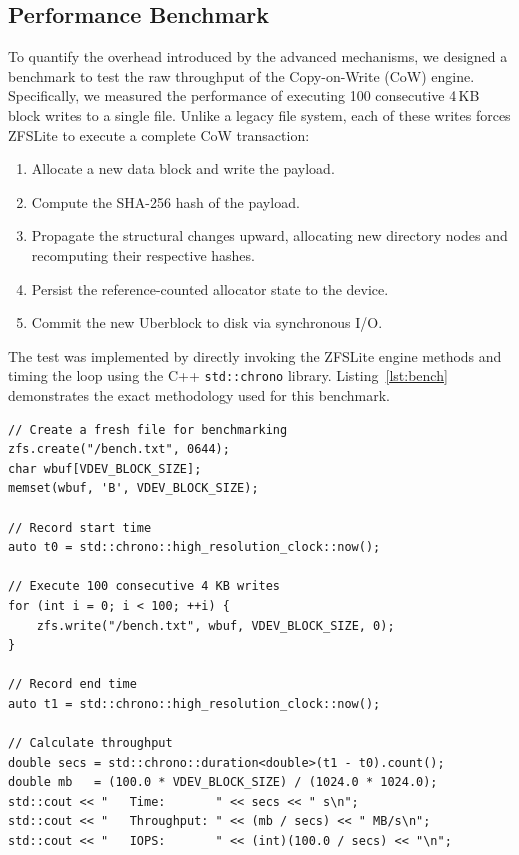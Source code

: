 \documentclass[pdflatex,sn-mathphys-num]{sn-jnl}
\begin{document}
\subsection{Performance Benchmark}

To quantify the overhead introduced by the advanced mechanisms, we designed a benchmark to test the raw throughput of the Copy-on-Write (CoW) engine. Specifically, we measured the performance of executing 100 consecutive 4\,KB block writes to a single file. Unlike a legacy file system, each of these writes forces ZFSLite to execute a complete CoW transaction:
\begin{enumerate}
    \item Allocate a new data block and write the payload.
    \item Compute the SHA-256 hash of the payload.
    \item Propagate the structural changes upward, allocating new directory nodes and recomputing their respective hashes.
    \item Persist the reference-counted allocator state to the device.
    \item Commit the new Uberblock to disk via synchronous I/O.
\end{enumerate}

The test was implemented by directly invoking the ZFSLite engine methods and timing the loop using the C++ \verb+std::chrono+ library. Listing~\ref{lst:bench} demonstrates the exact methodology used for this benchmark.

\begin{lstlisting}[caption={CoW throughput benchmark methodology.}, label={lst:bench}]
// Create a fresh file for benchmarking
zfs.create("/bench.txt", 0644);
char wbuf[VDEV_BLOCK_SIZE];
memset(wbuf, 'B', VDEV_BLOCK_SIZE);

// Record start time
auto t0 = std::chrono::high_resolution_clock::now();

// Execute 100 consecutive 4 KB writes
for (int i = 0; i < 100; ++i) {
    zfs.write("/bench.txt", wbuf, VDEV_BLOCK_SIZE, 0);
}

// Record end time
auto t1 = std::chrono::high_resolution_clock::now();

// Calculate throughput
double secs = std::chrono::duration<double>(t1 - t0).count();
double mb   = (100.0 * VDEV_BLOCK_SIZE) / (1024.0 * 1024.0);
std::cout << "   Time:       " << secs << " s\n";
std::cout << "   Throughput: " << (mb / secs) << " MB/s\n";
std::cout << "   IOPS:       " << (int)(100.0 / secs) << "\n";
\end{lstlisting}
\end{document}
